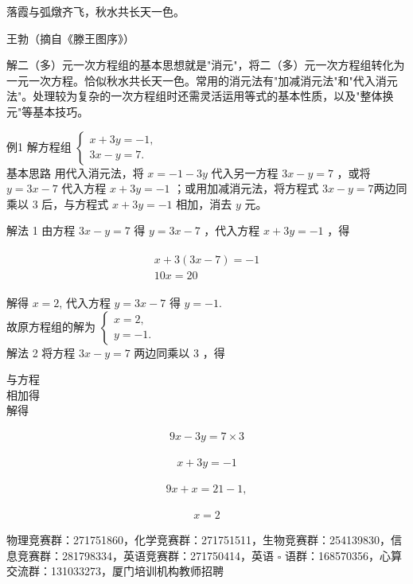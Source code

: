 \documentclass[10pt]{article}
\begin{document}
落霞与弧燉齐飞，秋水共长天一色。

王勃（摘自《滕王图序》）

解二（多）元一次方程组的基本思想就是"消元"，将二（多）元一次方程组转化为一元一次方程。恰似秋水共长天一色。常用的消元法有"加减消元法"和"代入消元法"。处理较为复杂的一次方程组时还需灵活运用等式的基本性质，以及"整体换元"等基本技巧。

例1 解方程组 $\left\{\begin{array}{l}x+3 y=-1, \\ 3 x-y=7 .\end{array}\right.$\\
基本思路 用代入消元法，将 $x=-1-3 y$ 代入另一方程 $3 x-y=7$ ，或将 $y=3 x-7$ 代入方程 $x+3 y=-1$ ；或用加减消元法，将方程式 $3 x-y=7$两边同乘以 3 后，与方程式 $x+3 y=-1$ 相加，消去 $y$ 元。

解法 1 由方程 $3 x-y=7$ 得 $y=3 x-7$ ，代入方程 $x+3 y=-1$ ，得

\begin{align*}
\begin{gathered}
x+3(3 x-7)=-1 \\
10 x=20
\end{gathered}
\end{align*}

解得 $x=2$, 代入方程 $y=3 x-7$ 得 $y=-1$.\\
故原方程组的解为 $\left\{\begin{array}{l}x=2, \\ y=-1 .\end{array}\right.$\\
解法 2 将方程 $3 x-y=7$ 两边同乘以 3 ，得

与方程\\
相加得\\
解得

\begin{align*}
9 x-3 y=7 \times 3
\end{align*}

\begin{align*}
x+3 y=-1
\end{align*}

\begin{align*}
9 x+x=21-1,
\end{align*}

\begin{align*}
x=2
\end{align*}

物理竞赛群：271751860，化学竞赛群：271751511，生物竞赛群：254139830，信息竞赛群：281798334，英语竞赛群：271750414，英语 $\square$ 语群：168570356，心算交流群：131033273，厦门培训机构教师招聘
\end{document}
